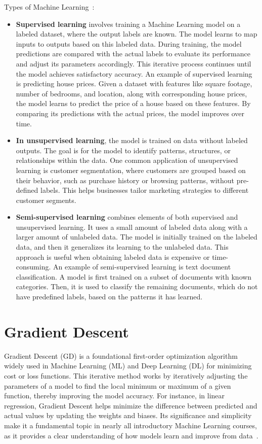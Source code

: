 \documentclass[12pt,a4paper]{report}
\begin{document}
Types of Machine Learning~\cite{machinelearning}:
\begin{itemize}
  \item \textbf{Supervised learning} involves training a Machine Learning model on a labeled dataset, where the output labels are known. The model learns to map inputs to outputs based on this labeled data. During training, the model predictions are compared with the actual labels to evaluate its performance and adjust its parameters accordingly. This iterative process continues until the model achieves satisfactory accuracy. An example of supervised learning is predicting house prices. Given a dataset with features like square footage, number of bedrooms, and location, along with corresponding house prices, the model learns to predict the price of a house based on these features. By comparing its predictions with the actual prices, the model improves over time.
  \item \textbf{In unsupervised learning}, the model is trained on data without labeled outputs. The goal is for the model to identify patterns, structures, or relationships within the data. One common application of unsupervised learning is customer segmentation, where customers are grouped based on their behavior, such as purchase history or browsing patterns, without pre-defined labels. This helps businesses tailor marketing strategies to different customer segments.
  \item \textbf{Semi-supervised learning} combines elements of both supervised and unsupervised learning. It uses a small amount of labeled data along with a larger amount of unlabeled data. The model is initially trained on the labeled data, and then it generalizes its learning to the unlabeled data. This approach is useful when obtaining labeled data is expensive or time-consuming. An example of semi-supervised learning is text document classification. A model is first trained on a subset of documents with known categories. Then, it is used to classify the remaining documents, which do not have predefined labels, based on the patterns it has learned.
\end{itemize}

\section{Gradient Descent}\vspace{-12pt}
Gradient Descent (GD) is a foundational first-order optimization algorithm widely used in Machine Learning (ML) and Deep Learning (DL) for minimizing cost or loss functions. This iterative method works by iteratively adjusting the parameters of a model to find the local minimum or maximum of a given function, thereby improving the model accuracy. For instance, in linear regression, Gradient Descent helps minimize the difference between predicted and actual values by updating the weights and biases. Its significance and simplicity make it a fundamental topic in nearly all introductory Machine Learning courses, as it provides a clear understanding of how models learn and improve from data~\cite{gradientdescent}.
\end{document}
